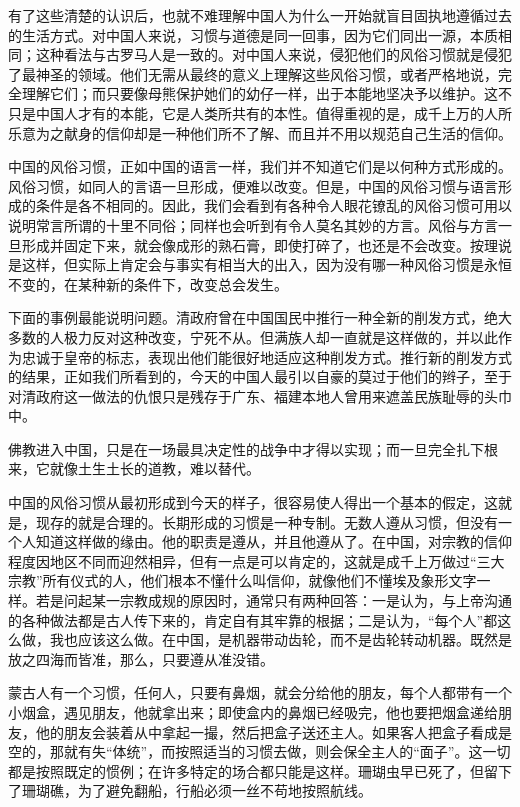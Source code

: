 \documentclass[12pt,oneside]{book}
\begin{document}
\begin{common-format}
有了这些清楚的认识后，也就不难理解中国人为什么一开始就盲目固执地遵循过去的生活方式。对中国人来说，习惯与道德是同一回事，因为它们同出一源，本质相同；这种看法与古罗马人是一致的。对中国人来说，侵犯他们的风俗习惯就是侵犯了最神圣的领域。他们无需从最终的意义上理解这些风俗习惯，或者严格地说，完全理解它们；而只要像母熊保护她们的幼仔一样，出于本能地坚决予以维护。这不只是中国人才有的本能，它是人类所共有的本性。值得重视的是，成千上万的人所乐意为之献身的信仰却是一种他们所不了解、而且并不用以规范自己生活的信仰。 

中国的风俗习惯，正如中国的语言一样，我们并不知道它们是以何种方式形成的。风俗习惯，如同人的言语一旦形成，便难以改变。但是，中国的风俗习惯与语言形成的条件是各不相同的。因此，我们会看到有各种令人眼花镣乱的风俗习惯可用以说明常言所谓的十里不同俗；同样也会听到有令人莫名其妙的方言。风俗与方言一旦形成并固定下来，就会像成形的熟石膏，即使打碎了，也还是不会改变。按理说是这样，但实际上肯定会与事实有相当大的出入，因为没有哪一种风俗习惯是永恒不变的，在某种新的条件下，改变总会发生。 

下面的事例最能说明问题。清政府曾在中国国民中推行一种全新的削发方式，绝大多数的人极力反对这种改变，宁死不从。但满族人却一直就是这样做的，并以此作为忠诚于皇帝的标志，表现出他们能很好地适应这种削发方式。推行新的削发方式的结果，正如我们所看到的，今天的中国人最引以自豪的莫过于他们的辫子，至于对清政府这一做法的仇恨只是残存于广东、福建本地人曾用来遮盖民族耻辱的头巾中。 

佛教进入中国，只是在一场最具决定性的战争中才得以实现；而一旦完全扎下根来，它就像土生土长的道教，难以替代。 

中国的风俗习惯从最初形成到今天的样子，很容易使人得出一个基本的假定，这就是，现存的就是合理的。长期形成的习惯是一种专制。无数人遵从习惯，但没有一个人知道这样做的缘由。他的职责是遵从，并且他遵从了。在中国，对宗教的信仰程度因地区不同而迎然相异，但有一点是可以肯定的，这就是成千上万做过“三大宗教”所有仪式的人，他们根本不懂什么叫信仰，就像他们不懂埃及象形文字一样。若是问起某一宗教成规的原因时，通常只有两种回答：一是认为，与上帝沟通的各种做法都是古人传下来的，肯定自有其牢靠的根据；二是认为，“每个人”都这么做，我也应该这么做。在中国，是机器带动齿轮，而不是齿轮转动机器。既然是放之四海而皆准，那么，只要遵从准没错。 

蒙古人有一个习惯，任何人，只要有鼻烟，就会分给他的朋友，每个人都带有一个小烟盒，遇见朋友，他就拿出来；即使盒内的鼻烟已经吸完，他也要把烟盒递给朋友，他的朋友会装着从中拿起一撮，然后把盒子送还主人。如果客人把盒子看成是空的，那就有失“体统”，而按照适当的习惯去做，则会保全主人的“面子”。这一切都是按照既定的惯例；在许多特定的场合都只能是这样。珊瑚虫早已死了，但留下了珊瑚礁，为了避免翻船，行船必须一丝不苟地按照航线。 


\end{common-format}
\end{document}
